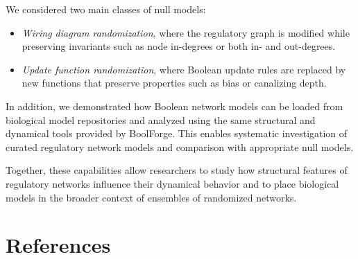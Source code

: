 \documentclass[
]{article}
\providecommand{\tightlist}{%
  \setlength{\itemsep}{0pt}\setlength{\parskip}{0pt}}
\begin{document}
We considered two main classes of null models:

\begin{itemize}
\tightlist
\item
  \emph{Wiring diagram randomization}, where the regulatory graph is
  modified while preserving invariants such as node in-degrees or both
  in- and out-degrees.
\item
  \emph{Update function randomization}, where Boolean update rules are
  replaced by new functions that preserve properties such as bias or
  canalizing depth.
\end{itemize}

In addition, we demonstrated how Boolean network models can be loaded
from biological model repositories and analyzed using the same
structural and dynamical tools provided by BoolForge. This enables
systematic investigation of curated regulatory network models and
comparison with appropriate null models.

Together, these capabilities allow researchers to study how structural
features of regulatory networks influence their dynamical behavior and
to place biological models in the broader context of ensembles of
randomized networks.

\section*{References}\label{references}


\end{document}
